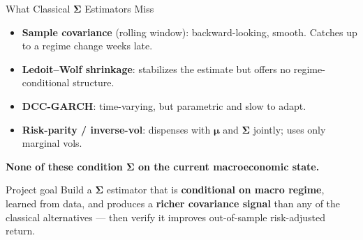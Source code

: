 \documentclass[10pt, aspectratio=169]{beamer}
\newcommand{\Sig}{\boldsymbol{\Sigma}}
\newcommand{\bmu}{\boldsymbol{\mu}}
\begin{document}
\begin{frame}{What Classical $\Sig$ Estimators Miss}
\begin{itemize}
  \item \textbf{Sample covariance} (rolling window): backward-looking, smooth. Catches up to a regime change weeks late.
  \item \textbf{Ledoit--Wolf shrinkage}: stabilizes the estimate but offers no regime-conditional structure.
  \item \textbf{DCC-GARCH}: time-varying, but parametric and slow to adapt.
  \item \textbf{Risk-parity / inverse-vol}: dispenses with $\bmu$ and $\Sig$ jointly; uses only marginal vols.
\end{itemize}
\vspace{0.5em}
\textbf{None of these condition $\Sig$ on the current macroeconomic state.}
\vspace{0.5em}
\begin{block}{Project goal}
Build a $\Sig$ estimator that is \textbf{conditional on macro regime}, learned from data, and produces a \textbf{richer covariance signal} than any of the classical alternatives --- then verify it improves out-of-sample risk-adjusted return.
\end{block}
\end{frame}
\end{document}
